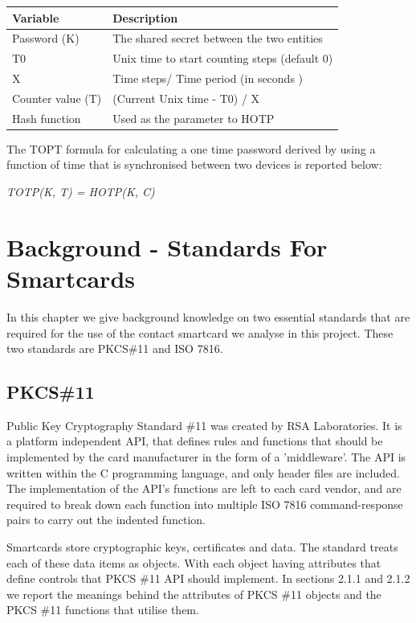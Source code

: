 \documentclass[bsc,frontabs,twoside,singlespacing,parskip,deptreport]{infthesis}     %
\begin{document}
\begin{table}[H]
\begin{tabular}{|l|p{10cm}|}
\hline
Variable & Description\\
\hline
Password (K) & The shared secret between the two entities\\
\hline
T0 & Unix time to start counting steps (default 0)\\
\hline
X & Time steps/ Time period  (in seconds )\\
\hline
Counter value (T) & (Current Unix time - T0) / X\\
\hline
Hash function & Used as the parameter to HOTP\\
\hline
\end{tabular}
\end{table}

The TOPT formula for calculating a one time password derived by using a function of time that is synchronised between two devices is reported below:

\begin{center}
\textit{ TOTP(K, T) = HOTP(K, C)}
\end{center}


\chapter{Background - Standards For Smartcards}

In this chapter we give background knowledge on two essential standards that are required for the use of the contact smartcard we analyse in this project. These two standards are PKCS\#11 and ISO 7816.

\section{PKCS\#11}
Public Key Cryptography Standard \#11 was created by RSA Laboratories. It is a platform independent API, that defines rules and functions that should be implemented by the card manufacturer in the form of a 'middleware'. The API is written within the C programming language, and only header files are included. The implementation of the API's functions are left to each card vendor, and are required to break down each function into multiple ISO 7816 command-response pairs to carry out the indented function.

Smartcards store cryptographic keys, certificates and data. The standard treats each of these data items as objects. With each object having attributes that define controls that PKCS \#11 API should implement. In sections 2.1.1 and 2.1.2 we report the meanings behind the attributes of PKCS \#11 objects and the PKCS \#11 functions that utilise them.
\end{document}
